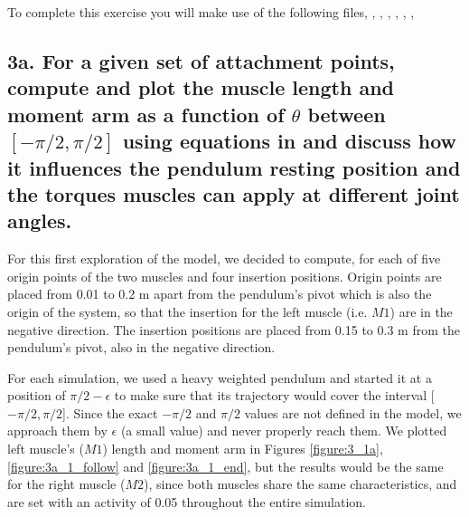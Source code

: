 \documentclass{cmc}
\begin{document}
To complete this exercise you will make use of the following files,
, ,
, , ,
, 

\label{sec:questions}

\subsection*{3a. For a given set of attachment points, compute and
  plot the muscle length and moment arm as a function of $\theta$
  between $[-\pi/2, \pi/2]$ using equations in 
  and discuss how it influences the pendulum resting position and the
  torques muscles can apply at different joint angles.}
\label{sec:3a}

For this first exploration of the model, we decided to compute, for each of five origin points of the two muscles and four insertion positions. Origin points are placed from 0.01 to 0.2 m apart from the pendulum's pivot which is also the origin of the system, so that the insertion for the left muscle (i.e. $M1$) are in the negative direction. The insertion positions are placed from 0.15 to 0.3 m from the pendulum's pivot, also in the negative direction.

For each simulation, we used a heavy weighted pendulum and started it at a position of $\pi/2 - \epsilon$ to make sure that its trajectory would cover the interval [$-\pi/2, \pi/2$]. Since the exact $-\pi/2$ and $\pi/2$ values are not defined in the model, we approach them by $\epsilon$ (a small value) and never properly reach them. We plotted left muscle's ($M1$) length and moment arm in Figures \ref{figure:3_1a}, \ref{figure:3a_1_follow} and \ref{figure:3a_1_end}, but the results would be the same for the right muscle ($M2$), since both muscles share the same characteristics, and are set with an activity of 0.05 throughout the entire simulation.
\end{document}
